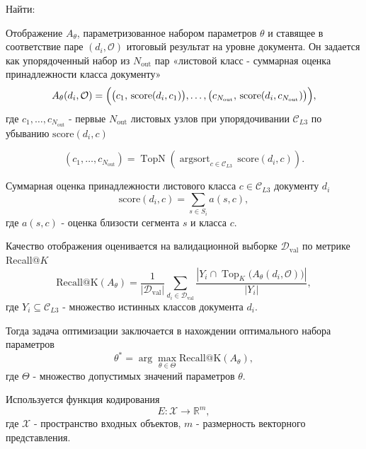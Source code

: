 Найти:

Отображение $A_{\theta}$, параметризованное набором параметров $\theta$ и ставящее в соответствие паре $(d_i,\mathcal{O})$
итоговый результат на уровне документа.
Он задается как упорядоченный набор из $N_{\text{out}}$ пар
«листовой класс - суммарная оценка принадлежности класса документу»
\begin{equation}
    \label{eq:doc-annotation}
    A_{\theta}(d_i,\mathcal{O}) =
    \Bigl(
    \bigl(c_{1},\, \mathrm{score}(d_i,c_{1})\bigr),
    \ldots,
    \bigl(c_{N_{\text{out}}},\, \mathrm{score}(d_i,c_{N_{\text{out}}})\bigr)
    \Bigr),
\end{equation}
\noindent где $c_{1},\ldots,c_{N_{\text{out}}}$ - первые $N_{\text{out}}$ листовых узлов
при упорядочивании $\mathcal{C}_{L3}$ по убыванию $\mathrm{score}(d_i,c)$

\begin{equation}
    \label{eq:topn-specs}
    (c_{1},\ldots,c_{N_{\text{out}}}) =
    \operatorname{TopN}\!\left(
    \operatorname{argsort}_{c\in\mathcal{C}_{L3}}\, \mathrm{score}(d_i,c)
    \right).
\end{equation}

Суммарная оценка принадлежности листового класса $c\in\mathcal{C}_{L3}$ документу $d_i$
\begin{equation}
    \label{eq:doc-score-sum}
    \mathrm{score}(d_i,c)=
    \sum_{s\in S_i} a(s,c),
\end{equation}
\noindent где $a(s,c)$ - оценка близости сегмента $s$ и класса $c$.

Качество отображения оценивается на валидационной выборке $\mathcal{D}_{\mathrm{val}}$ по метрике Recall@$K$
\begin{equation}
\mathrm{Recall@K}(A_{\theta})=
\frac{1}{|\mathcal{D}_{\mathrm{val}}|}
\sum_{d_i\in\mathcal{D}_{\mathrm{val}}}
\frac{\left|Y_i \cap \operatorname{Top}_{K}\!\bigl(A_{\theta}(d_i,\mathcal{O})\bigr)\right|}{|Y_i|},
\end{equation}
\noindent где $Y_i\subseteq\mathcal{C}_{L3}$ - множество истинных классов документа $d_i$.

Тогда задача оптимизации заключается в нахождении оптимального набора параметров
\begin{equation}
\theta^{*}=\arg\max_{\theta\in\Theta}\mathrm{Recall@K}(A_{\theta}),
\end{equation}
\noindent где $\Theta$ - множество допустимых значений параметров $\theta$.

Используется функция кодирования
\begin{equation}
E: \mathcal{X} \rightarrow \mathbb{R}^{m},
\end{equation}
\noindent где $\mathcal{X}$ - пространство входных объектов, $m$ - размерность векторного представления.

